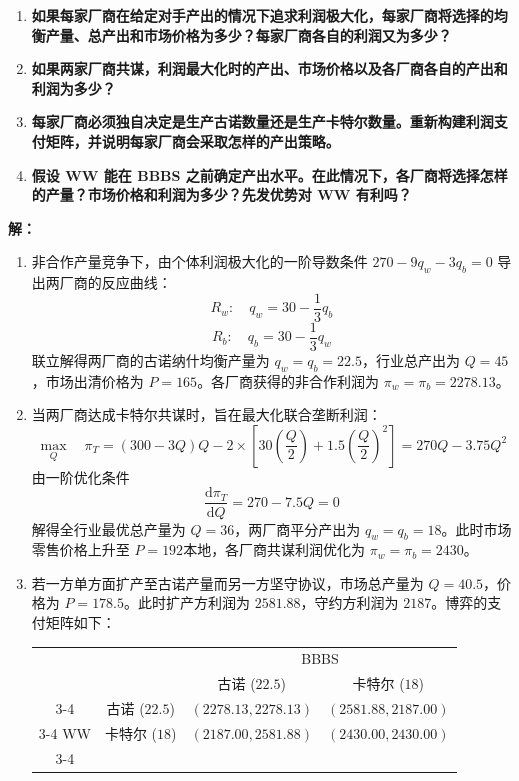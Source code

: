\begin{enumerate}[label=\textbf{\arabic*.}, leftmargin=*]
		\begin{enumerate}
			\item \textbf{如果每家厂商在给定对手产出的情况下追求利润极大化，每家厂商将选择的均衡产量、总产出和市场价格为多少？每家厂商各自的利润又为多少？}
			\item \textbf{如果两家厂商共谋，利润最大化时的产出、市场价格以及各厂商各自的产出和利润为多少？}
			\item \textbf{每家厂商必须独自决定是生产古诺数量还是生产卡特尔数量。重新构建利润支付矩阵，并说明每家厂商会采取怎样的产出策略。}
			\item \textbf{假设 WW 能在 BBBS 之前确定产出水平。在此情况下，各厂商将选择怎样的产量？市场价格和利润为多少？先发优势对 WW 有利吗？}
		\end{enumerate}
		
		\textbf{解：}
		\begin{enumerate}
			\item[(1)] 非合作产量竞争下，由个体利润极大化的一阶导数条件 $270 - 9q_w - 3q_b = 0$ 导出两厂商的反应曲线：
			\[ R_w: \quad q_w = 30 - \frac{1}{3}q_b \]
			\[ R_b: \quad q_b = 30 - \frac{1}{3}q_w \]
			联立解得两厂商的古诺纳什均衡产量为 $q_w = q_b = 22.5$，行业总产出为 $Q = 45$，市场出清价格为 $P = 165$。各厂商获得的非合作利润为 $\pi_w = \pi_b = 2278.13$。
			
			\item[(2)] 当两厂商达成卡特尔共谋时，旨在最大化联合垄断利润：
			\[ \max_{Q} \quad \pi_T = (300 - 3Q)Q - 2 \times \left[30\left(\frac{Q}{2}\right) + 1.5\left(\frac{Q}{2}\right)^2\right] = 270Q - 3.75Q^2 \]
			由一阶优化条件 $$\frac{\mathrm{d}\pi_T}{\mathrm{d}Q} = 270 - 7.5Q = 0$$ 解得全行业最优总产量为 $Q = 36$，两厂商平分产出为 $q_w = q_b = 18$。此时市场零售价格上升至 $P = 192本地$，各厂商共谋利润优化为 $\pi_w = \pi_b = 2430$。
			
			\item[(3)] 若一方单方面扩产至古诺产量而另一方坚守协议，市场总产量为 $Q = 40.5$，价格为 $P = 178.5$。此时扩产方利润为 $2581.88$，守约方利润为 $2187$。博弈的支付矩阵如下：
			
			\begin{center}
				\renewcommand{\arraystretch}{1.4}
				\setlength{\tabcolsep}{6pt}
				\begin{tabular}{cc|c|c|}
					& \multicolumn{1}{c}{} & \multicolumn{2}{c}{BBBS} \\
					& \multicolumn{1}{c}{} & \multicolumn{1}{c}{古诺 ($22.5$)} & \multicolumn{1}{c}{卡特尔 ($18$)} \\
					\cline{3-4}
					& 古诺 ($22.5$) & $(2278.13, 2278.13)$ & $(2581.88, 2187.00)$ \\
					\cline{3-4}
					WW & 卡特尔 ($18$) & $(2187.00, 2581.88)$ & $(2430.00, 2430.00)$ \\
					\cline{3-4}
				\end{tabular}
			\end{center}
			

\end{enumerate}
\end{enumerate}
